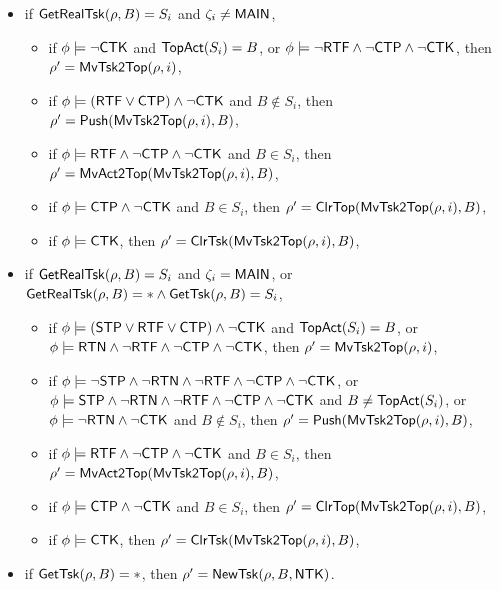{\begin{itemize}
	\begin{itemize}
        \item if $\mathsf{GetRealTsk}(\rho, B) = S_i$ and $\zeta_i\neq{\sf MAIN}$,
            \begin{itemize}
            \item if $\phi\models\neg{\sf CTK}$ and $\mathsf{TopAct}(S_i) = B$, 
                or $\phi\models\neg{\sf RTF}\wedge\neg{\sf CTP}\wedge\neg{\sf CTK}$,
                then $\rho'=\mathsf{MvTsk2Top}(\rho, i)$,
            \item if $\phi\models({\sf RTF}\vee{\sf CTP})\wedge\neg{\sf CTK}$ and $B\notin S_i$,
                    then $\rho'=\mathsf{Push}(\mathsf{MvTsk2Top}(\rho, i), B)$,
            \item if $\phi \models {\sf RTF} \wedge \neg {\sf CTP}\wedge\neg{\sf CTK}$ and $B \in S_i$,
                then 
                $\rho'=\mathsf{MvAct2Top}(\mathsf{MvTsk2Top}(\rho, i), B)$,
            \item if $\phi \models{\sf CTP}\wedge\neg{\sf CTK}$ and $B \in S_i$, then $\rho' =\mathsf{ClrTop}(\mathsf{MvTsk2Top}(\rho, i), B)$,
            \item if $\phi \models{\sf CTK}$, then
            $\rho' = \mathsf{ClrTsk}(\mathsf{MvTsk2Top}(\rho, i), B)$,
            \end{itemize}
            \item if $\mathsf{GetRealTsk}(\rho, B) = S_i$ and $\zeta_i={\sf MAIN}$,
        or $ \mathsf{GetRealTsk}(\rho, B) = * \wedge \mathsf{GetTsk}(\rho, B) = S_i$, 
		\begin{itemize}
            \item if $\phi \models ({\sf STP}\vee{\sf RTF}\vee{\sf CTP})\wedge\neg{\sf CTK}$ and $\mathsf{TopAct}(S_i) = B$,
            or $\phi \models {\sf RTN} \wedge\neg{\sf RTF}\wedge\neg{\sf CTP}\wedge\neg{\sf CTK}$, then 
                $\rho' = \mathsf{MvTsk2Top}(\rho, i)$,
            \item if $\phi\models\neg{\sf STP}\wedge\neg{\sf RTN}\wedge\neg{\sf RTF}\wedge\neg{\sf CTP}\wedge\neg{\sf CTK}$,
                or $\phi\models{\sf STP}\wedge\neg{\sf RTN}\wedge\neg{\sf RTF}\wedge\neg{\sf CTP}\wedge\neg{\sf CTK}$ and $B\neq\mathsf{TopAct}(S_i)$,
                or $\phi\models\neg{\sf RTN}\wedge\neg{\sf CTK}$ and $B\notin S_i$,
                    then $\rho'=\mathsf{Push}(\mathsf{MvTsk2Top}(\rho, i), B)$,
            \item if $\phi \models {\sf RTF} \wedge \neg {\sf CTP}\wedge\neg{\sf CTK}$ and $B \in S_i$, then 
                $\rho'=\mathsf{MvAct2Top}(\mathsf{MvTsk2Top}(\rho, i), B)$,
            \item if $\phi \models{\sf CTP}\wedge\neg{\sf CTK}$ and $B \in S_i$, then 
                $\rho' =\mathsf{ClrTop}(\mathsf{MvTsk2Top}(\rho, i),B)$,
            \item if $\phi \models{\sf CTK}$, then
            $\rho' = \mathsf{ClrTsk}(\mathsf{MvTsk2Top}(\rho, i), B)$,
		\end{itemize}
		\item if $\mathsf{GetTsk}(\rho, B) = *$, then $\rho' = \mathsf{NewTsk}(\rho, B, {\sf NTK})$.
	\end{itemize}
\end{itemize}

}
